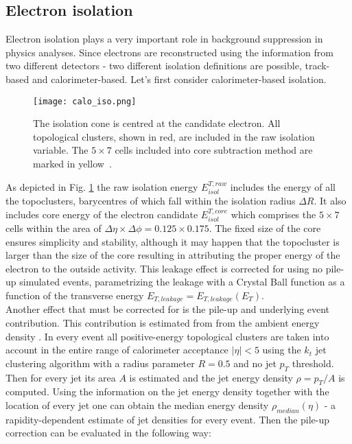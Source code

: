     \subsection{Electron isolation}
    Electron isolation plays a very important role in background suppression in physics analyses. Since electrons are reconstructed using the information from two different detectors - two different isolation definitions are possible, track-based and calorimeter-based. Let's first consider calorimeter-based isolation.\\
	 \begin{figure}[htbp]
		\centering
		\texttt{[image: calo\_iso.png]}
		\caption[Isolation plot]{The isolation cone is centred at the candidate electron. All topological clusters, shown in red, are included in the raw isolation variable. The $5\times 7$ cells included into core subtraction method are marked in yellow~\cite{topoclust_2019}.}
		\label{fig::calo_iso}
	\end{figure}
	As depicted in Fig. \ref{fig::calo_iso} the raw isolation energy $E_{isol}^{T,raw}$ includes the energy of all the topoclusters, barycentres of which fall within the isolation radius $\Delta R$. It also includes core energy of the electron candidate $E_{isol}^{T,core}$ which comprises the $5\times 7$ cells within the area of $\Delta \eta \times \Delta \phi = 0.125 \times 0.175$. The fixed size of the core ensures simplicity and stability, although it may happen that the topocluster is larger than the size of the core resulting in attributing the proper energy of the electron to the outside activity. This leakage effect is corrected for using no pile-up simulated events, parametrizing the leakage with a Crystal Ball function as a function of the transverse energy $E_{T,leakage}=E_{T,leakage}(E_T)$.\\
	Another effect that must be corrected for is the pile-up and underlying event contribution. This contribution is estimated from from the ambient energy density \cite{Cacciari:2007fd}. In every event all positive-energy topological clusters are taken into account in the entire range of calorimeter acceptance  $|\eta|<5$ using the $k_t$ jet clustering algorithm with a radius parameter $R=0.5$ and no jet $p_T$ threshold. Then for every jet its area $A$ is estimated and the jet energy density $\rho=p_T/A$ is computed. Using the information on the jet energy density together with the location of every jet one can obtain the median energy density $\rho_{median}(\eta)$ - a rapidity-dependent estimate of jet densities for every event. Then the pile-up correction can be evaluated in the following way:
